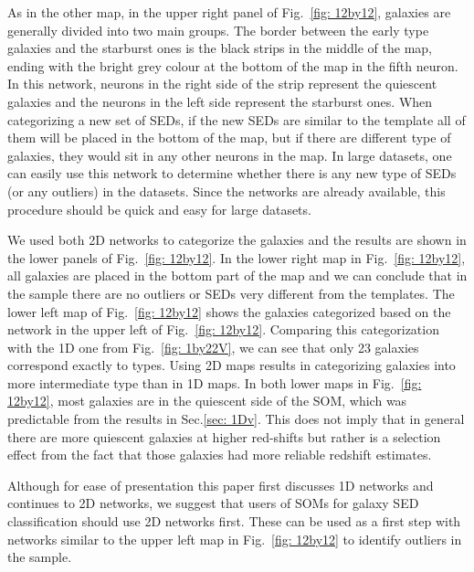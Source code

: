     As in the other map, in the upper right panel of Fig.~\ref{fig: 12by12}, galaxies are generally divided into two main groups.
    The border between the early type galaxies and the starburst ones is the black strips in the middle of the map,  ending with the bright grey colour at the bottom of the map in the fifth neuron.
    In this network, neurons in the right side of the strip represent the quiescent galaxies and the neurons in the left side represent the starburst ones. 
    When categorizing a new set of SEDs, if the new SEDs are similar to the  template all of them will be placed in the bottom of the map, but if there are different type of galaxies, they would sit in any other neurons in the map.
    In large datasets, one can easily use this network to determine whether there is any new type of SEDs (or any outliers) in the datasets. 
    Since the networks are already available, this procedure should be quick and easy for large datasets.
    
    We used both 2D networks to categorize the  galaxies and the results are shown in the lower panels of Fig.~\ref{fig: 12by12}.
    In the lower right map in Fig.~\ref{fig: 12by12}, all galaxies are placed in the bottom part of the map and we can conclude that in the  sample there are no outliers or SEDs very different from  the  templates.
    The lower left map of Fig.~\ref{fig: 12by12} shows the  galaxies categorized based on the network in the upper left of Fig.~\ref{fig: 12by12}. 
    Comparing this categorization with the 1D one from Fig.~\ref{fig: 1by22V}, we can see that only 23 galaxies correspond exactly to  types.
    Using 2D maps results in categorizing galaxies into more intermediate type than in 1D maps.
    In both lower maps in Fig.~\ref{fig: 12by12}, most galaxies are in the quiescent side of the SOM, which was predictable from the results in Sec.\ref{sec: 1Dv}. This does not imply that in general there are more quiescent galaxies at higher red-shifts but rather is a selection effect from the fact that those galaxies had more reliable redshift estimates.
    
    Although for ease of presentation this paper first discusses 1D networks and continues to 2D networks, we suggest that users of SOMs for galaxy SED classification should use 2D networks first. These can be used as a first step with networks similar to the upper left map in Fig.~\ref{fig: 12by12} to identify outliers in the sample.

    
 
